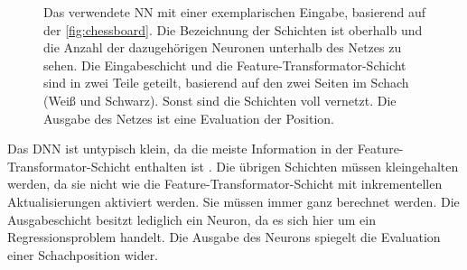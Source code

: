 \begin{figure}
{
  }%
  \caption{Das verwendete \ac{NN} mit einer exemplarischen Eingabe, basierend auf der \autoref{fig:chessboard}. Die Bezeichnung der Schichten ist oberhalb und die Anzahl der dazugehörigen Neuronen unterhalb des Netzes zu sehen. Die Eingabeschicht und die Feature-Transformator-Schicht sind in zwei Teile geteilt, basierend auf den zwei Seiten im Schach (Weiß und Schwarz). Sonst sind die Schichten voll vernetzt. Die Ausgabe des Netzes ist eine Evaluation der Position.}
  \label{fig:own-nn}
\end{figure}

Das \ac{DNN} ist untypisch klein, da die meiste Information in der Feature-Transformator-Schicht enthalten ist \cite{StockfishNNUE}. Die übrigen Schichten müssen kleingehalten werden, da sie nicht wie die Feature-Transformator-Schicht mit inkrementellen Aktualisierungen aktiviert werden. Sie müssen immer ganz berechnet werden. Die Ausgabeschicht besitzt lediglich ein Neuron, da es sich hier um ein Regressionsproblem handelt. Die Ausgabe des Neurons spiegelt die Evaluation einer Schachposition wider.

